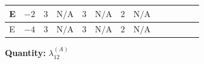 \documentclass[8pt]{article}
\begin{document}
\begin{landscape}
\begin{longtable}{@{}llcccccc >{\raggedright\arraybackslash}p{0.21\linewidth} >{\raggedright\arraybackslash}p{0.21\linewidth} >{\raggedright\arraybackslash}p{0.21\linewidth}@{}}
\midrule
E & $-2$ & $3$ & $\text{N/A}$ & $3$ & $\text{N/A}$ & $2$ & $\text{N/A}$ & \scriptsize\adjustbox{max width=\linewidth}{$\begin{gathered} +8 {\lambda_{12}^{(1)}} {\lambda_{12}^{(A)}}\end{gathered}$} & \scriptsize\adjustbox{max width=\linewidth}{$\begin{gathered} +2 {\lambda_{12}^{(A)}} {\lambda_{S_1}^{(1)}}\end{gathered}$} & \scriptsize\adjustbox{max width=\linewidth}{$\begin{gathered} +2 {\lambda_{12}^{(A)}} {\lambda_{S_2}^{(1)}}\end{gathered}$} \\
\midrule
E & $-4$ & $3$ & $\text{N/A}$ & $3$ & $\text{N/A}$ & $2$ & $\text{N/A}$ & \scriptsize\adjustbox{max width=\linewidth}{$\begin{gathered} +8 {\lambda_{12}^{(1)}} {\lambda_{12}^{(A)}}\end{gathered}$} & \scriptsize\adjustbox{max width=\linewidth}{$\begin{gathered} +2 {\lambda_{12}^{(A)}} {\lambda_{S_1}^{(1)}}\end{gathered}$} & \scriptsize\adjustbox{max width=\linewidth}{$\begin{gathered} +2 {\lambda_{12}^{(A)}} {\lambda_{S_2}^{(1)}}\end{gathered}$} \\
\midrule
\bottomrule
\end{longtable}
\clearpage
\noindent\textbf{Quantity: }$\lambda_{12}^{(A)}$\par\smallskip

\end{landscape}
\end{document}
